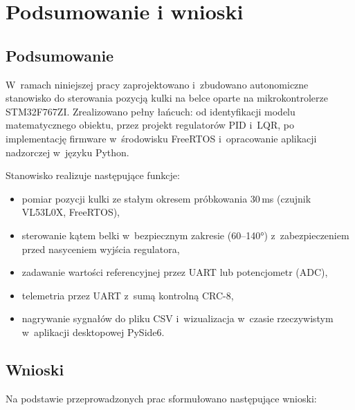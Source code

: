 
\chapter{Podsumowanie i wnioski}
\label{ch:wnioski}

\section{Podsumowanie}

W~ramach niniejszej pracy zaprojektowano i~zbudowano autonomiczne stanowisko
do sterowania pozycją kulki na belce oparte na mikrokontrolerze STM32F767ZI.
Zrealizowano pełny łańcuch: od identyfikacji modelu matematycznego obiektu,
przez projekt regulatorów PID i~LQR, po implementację firmware w~środowisku
FreeRTOS i~opracowanie aplikacji nadzorczej w~języku Python.

Stanowisko realizuje następujące funkcje:
\begin{itemize}
  \item pomiar pozycji kulki ze stałym okresem próbkowania 30\,ms (czujnik VL53L0X, FreeRTOS),
  \item sterowanie kątem belki w~bezpiecznym zakresie (60--140°) z~zabezpieczeniem
        przed nasyceniem wyjścia regulatora,
  \item zadawanie wartości referencyjnej przez UART lub potencjometr (ADC),
  \item telemetria przez UART z~sumą kontrolną CRC-8,
  \item nagrywanie sygnałów do pliku CSV i~wizualizacja w~czasie rzeczywistym
        w~aplikacji desktopowej PySide6.
\end{itemize}

\section{Wnioski}

Na podstawie przeprowadzonych prac sformułowano następujące wnioski:

